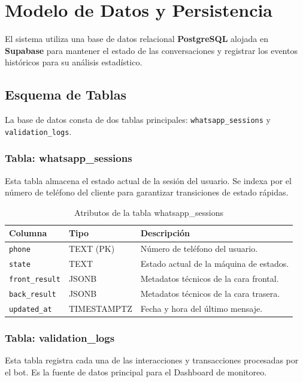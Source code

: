 \section{Modelo de Datos y Persistencia}
\label{sec:database}

El sistema utiliza una base de datos relacional \textbf{PostgreSQL} alojada en \textbf{Supabase} para mantener el estado de las conversaciones y registrar los eventos históricos para su análisis estadístico.

\subsection{Esquema de Tablas}
La base de datos consta de dos tablas principales: \texttt{whatsapp\_sessions} y \texttt{validation\_logs}.

\subsubsection{Tabla: whatsapp\_sessions}
Esta tabla almacena el estado actual de la sesión del usuario. Se indexa por el número de teléfono del cliente para garantizar transiciones de estado rápidas.

\begin{table}[ht]
\centering
\caption{Atributos de la tabla whatsapp\_sessions}
\footnotesize
\renewcommand{\arraystretch}{1.4}
\begin{tabular}{p{1.8cm} p{2cm} p{3cm}}
\toprule
\textbf{Columna} & \textbf{Tipo} & \textbf{Descripción} \\
\midrule
\texttt{phone} & TEXT (PK) & Número de teléfono del usuario. \\
\texttt{state} & TEXT & Estado actual de la máquina de estados. \\
\texttt{front\_result} & JSONB & Metadatos técnicos de la cara frontal. \\
\texttt{back\_result} & JSONB & Metadatos técnicos de la cara trasera. \\
\texttt{updated\_at} & TIMESTAMPTZ & Fecha y hora del último mensaje. \\
\bottomrule
\end{tabular}
\end{table}

\subsubsection{Tabla: validation\_logs}
Esta tabla registra cada una de las interacciones y transacciones procesadas por el bot. Es la fuente de datos principal para el Dashboard de monitoreo.

